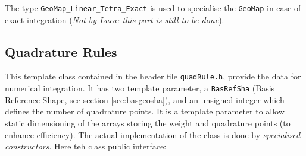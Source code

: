 The type \texttt{GeoMap\_Linear\_Tetra\_Exact} is used to specialise the
\texttt{GeoMap} in case of exact integration (\textsl{Not by Luca: this
part is still to be done}).
\subsection{Quadrature Rules}
\label{sec:quadrule}
This template class contained in the header file \texttt{quadRule.h},
provide the data for numerical integration.
It has two template parameter, a \texttt{BasRefSha} (Basis Reference Shape, 
see section \ref{sec:basgeosha}), and an unsigned integer which defines the number of quadrature
points. It is a template parameter to allow static dimensioning of the arrays storing
the weight and quadrature points (to enhance efficiency). The actual implementation of
the class is done by \textit{specialised constructors}\cite{Stroustrup:2000}.
Here teh class public interface: 

